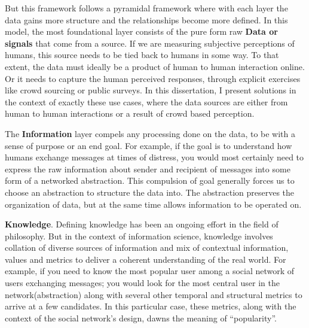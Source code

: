 But this framework follows a pyramidal framework where with each layer the data gains more structure and the relationships become more defined. In this model, the most foundational layer consists of the pure form raw \textbf{Data or signals} that come from a source. If we are measuring subjective perceptions of humans, this source needs to be tied back to humans in some way. To that extent, the data must ideally be a product of human to human interaction online. Or it needs to capture the human perceived responses, through explicit exercises like crowd sourcing or public surveys. In this dissertation, I present solutions in the context of exactly these use cases, where the data sources are either from human to human interactions or a result of crowd based perception. 

The \textbf{Information} layer compels any processing done on the data, to be with a sense of purpose or an end goal. For example, if the goal is to understand how humans exchange messages at times of distress, you would most certainly need to express the raw information about sender and recipient of messages into some form of a networked abstraction. This compulsion of goal generally forces us to choose an abstraction to structure the data into. The abstraction preserves the organization of data, but at the same time allows information to be operated on.  

\textbf{Knowledge}. Defining knowledge has been an ongoing effort in the field of philosophy. But in the context of information science, knowledge involves collation of diverse sources of information and mix of contextual information, values and metrics to deliver a coherent understanding of the real world. For example, if you need to know the most popular user among a social network of users exchanging messages; you would look for the most central user in the network(abstraction) along with several other temporal and structural metrics to arrive at a few candidates. In this particular case, these metrics, along with the context of the social network's design, dawns the meaning of ``popularity''. 

